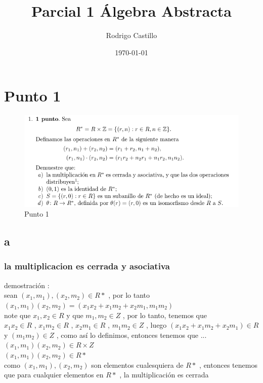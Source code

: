 \documentclass[10pt,a4paper]{article} %
\begin{document}
    \title{{  Parcial 1 Álgebra Abstracta  }}
    \author{{Rodrigo Castillo}}
    \date{\today}

    \maketitle


    \section{ Punto 1 }
        \begin{figure}[h!]
            \centering
            \includegraphics[width=0.8\linewidth]{punto1.png}
            \caption{Punto 1}
            \label{punto1}
        \end{figure}

        \subsection{a}

            \subsubsection{la multiplicacion es cerrada y asociativa}
                demostración :
                \\
                sean $ (x_1 , m_1 ) , (x_2 , m_2 ) \in R*  $  , por lo tanto  $
                (x_1,m_1)(x_2 , m_2) = (x_1x_2 + x_1m_2 + x_2m_1 , m_1m_2)  $
                \\
                note que $ x_1,x_2 \in R  $ y que $ m_1 , m_2 \in Z  $ , por lo tanto, tenemos que
                \\
                $ x_1x_2 \in R  $  , $ x_1m_2 \in R  $  , $ x_2m_1 \in  R  $ , $
                m_1m_2 \in Z  $ , luego $ (x_1x_2 + x_1m_2 + x_2m_1) \in R
                $ y $ (m_1m_2) \in Z  $ , como así lo definimos, entonces tenemos que ...
                \\
                $ (x_1,m_1)(x_2,m_2) \in R \times Z  $
                \\
                $ (x_1,m_1)(x_2,m_2) \in R* $
                \\
                como $ (x_1 , m_1) , (x_2 ,m_2)   $ son elementos cualesquiera de $
                R*  $ , entonces tenemos que para cualquier elementos en $ R*  $ ,
                la multiplicación es cerrada
\end{document}
